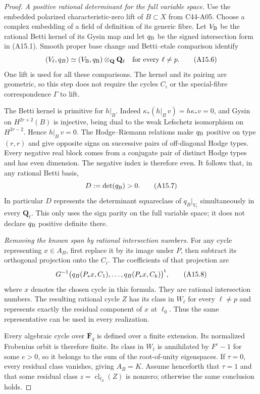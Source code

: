 \documentclass[11pt]{article}
\theoremstyle{remark}\newtheorem{remark}[theorem]{Remark}
\begin{document}
\begin{proof}
\emph{A positive rational determinant for the full variable space.}
Use the embedded polarized characteristic-zero lift of $B\subset X$
from C44-A05. Choose a complex embedding of a field of definition
of its generic fibre. Let $V_{\rm B}$ be the rational Betti
kernel of its Gysin map and let $q_{\rm B}$ be the signed
intersection form in (A15.1). Smooth proper base change and
Betti--etale comparison identify
\[
           (V_\ell,q_B)\simeq
              (V_{\rm B},q_{\rm B})\otimes_{\mathbf Q}\mathbf Q_\ell
                \quad\hbox{for every }\ell\ne p.
 \tag{A15.6}
\]
One lift is used for all these comparisons. The kernel and its
pairing are geometric, so this step does not require the cycles
$C_i$ or the special-fibre correspondence $\Gamma$ to lift.

The Betti kernel is primitive for $h|_B$. Indeed
$\kappa_*(h|_B\,v)=h\kappa_*v=0$, and Gysin on
$H^{2r+2}(B)$ is injective, being dual to the weak Lefschetz
isomorphism on $H^{2r-2}$. Hence $h|_B\,v=0$.
The Hodge--Riemann relations make $q_{\rm B}$ positive on
type $(r,r)$ and give opposite signs on successive pairs of
off-diagonal Hodge types. Every negative real block comes
from a conjugate pair of distinct Hodge types and has even
dimension. The negative index is therefore even. It follows
that, in any rational Betti basis,
\[
                       D:=\det(q_{\rm B})>0.
 \tag{A15.7}
\]
In particular $D$ represents the determinant squareclass of
$q_B|_{V_\ell}$ simultaneously in every $\mathbf Q_\ell$.
This only uses the sign parity on the full variable space;
it does not declare $q_{\rm B}$ positive definite there.

\emph{Removing the known span by rational intersection numbers.}
For any cycle representing $x\in A_B$, first replace it by
its image under $P$, then subtract its orthogonal projection
onto the $C_i$. The coefficients of that projection are
\[
     G^{-1}\bigl(q_B(P_*x,C_1),\ldots,q_B(P_*x,C_k)\bigr)^{\rm t},
 \tag{A15.8}
\]
where $x$ denotes the chosen cycle in this formula. They are
rational intersection numbers. The resulting rational cycle
$Z$ has its class in $W_\ell$ for every $\ell\ne p$ and
represents exactly the residual component of $x$ at $\ell_0$.
Thus the same representative can be used in every realization.

Every algebraic cycle over $\overline{\mathbf F}_q$ is defined
over a finite extension. Its normalized Frobenius orbit is
therefore finite. Its class in $W_\ell$ is annihilated by
$F^e-1$ for some $e>0$, so it belongs to the sum of the
root-of-unity eigenspaces. If $\tau=0$, every residual class
vanishes, giving $A_B=K$. Assume henceforth that $\tau=1$ and
that some residual class $z=\operatorname{cl}_{\ell_0}(Z)$ is
nonzero; otherwise the same conclusion holds.


\end{proof}
\end{document}
